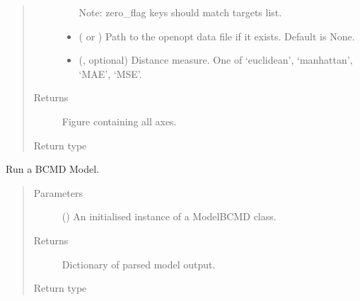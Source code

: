 \documentclass[letterpaper,10pt,english]{sphinxmanual}
\begin{document}
\begin{fulllineitems}
\begin{quote}
\begin{description}
\begin{itemize}
Note: zero\_flag keys should match targets list.


\item {} 
 ( or ) \textendash{} Path to the openopt data file if it exists. Default is None.

\item {} 
 (, optional) \textendash{} Distance measure. One of ‘euclidean’, ‘manhattan’, ‘MAE’, ‘MSE’.

\end{itemize}

\item[{Returns}] \leavevmode
{} \textendash{} Figure containing all axes.

\item[{Return type}] \leavevmode
{}

\end{description}\end{quote}

\end{fulllineitems}


\begin{fulllineitems}
\label{\detokenize{misc:bayescmd.results_handling.run_model}}
Run a BCMD Model.
\begin{quote}\begin{description}
\item[{Parameters}] \leavevmode
{} ({\hyperref[\detokenize{bcmdModel:bayescmd.bcmdModel.ModelBCMD}]{}}) \textendash{} An initialised instance of a ModelBCMD class.

\item[{Returns}] \leavevmode
{} \textendash{} Dictionary of parsed model output.

\item[{Return type}] \leavevmode
{}

\end{description}\end{quote}

\end{fulllineitems}
\end{document}
